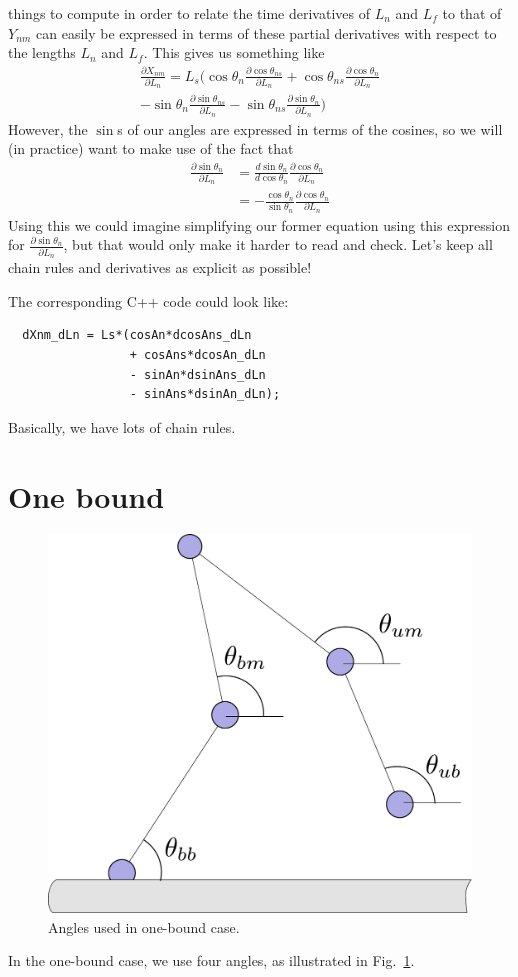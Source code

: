 \documentclass[11pt,twocolumn]{article}
\begin{document}
things to compute in order to relate the time derivatives of $L_n$ and
$L_f$ to that of $Y_{nm}$ can easily be expressed in terms of these
partial derivatives with respect to the lengths $L_n$ and $L_f$.  This
gives us something like
\begin{multline}
  \frac{\partial X_{nm}}{\partial L_n} = L_s\Bigg(
  \cos\theta_n\frac{\partial \cos\theta_{ns}}{\partial L_n}
  + \cos\theta_{ns}\frac{\partial \cos\theta_{n}}{\partial L_n} \\
  - \sin\theta_n\frac{\partial \sin\theta_{ns}}{\partial L_n}
  - \sin\theta_{ns}\frac{\partial \sin\theta_{n}}{\partial L_n}
  \Bigg)
\end{multline}
However, the $\sin$s of our angles are expressed in terms of the
cosines, so we will (in practice) want to make use of the fact that
\begin{align}
  \frac{\partial \sin\theta_{n}}{\partial L_n} &=
  \frac{d \sin\theta_{n}}{d \cos\theta_n}
  \frac{\partial \cos\theta_{n}}{\partial L_n} \\
  &=
  -\frac{\cos\theta_{n}}{\sin\theta_n}
  \frac{\partial \cos\theta_{n}}{\partial L_n}
\end{align}
Using this we could imagine simplifying our former equation using this
expression for $\frac{\partial \sin\theta_{n}}{\partial L_n}$, but
that would only make it harder to read and check.  Let's keep all
chain rules and derivatives as explicit as possible!

The
corresponding C++ code could look like:
\begin{verbatim}
  dXnm_dLn = Ls*(cosAn*dcosAns_dLn
                 + cosAns*dcosAn_dLn
                 - sinAn*dsinAns_dLn
                 - sinAns*dsinAn_dLn);
\end{verbatim}
Basically, we have lots of chain rules.

\section{One bound}

\begin{figure}
  \includegraphics[width=\columnwidth]{../figures/code-onebound}
  \caption{Angles used in one-bound case.}\label{fig:onebound}
\end{figure}

In the one-bound case, we use four angles, as illustrated in
Fig.~\ref{fig:onebound}.
\end{document}
